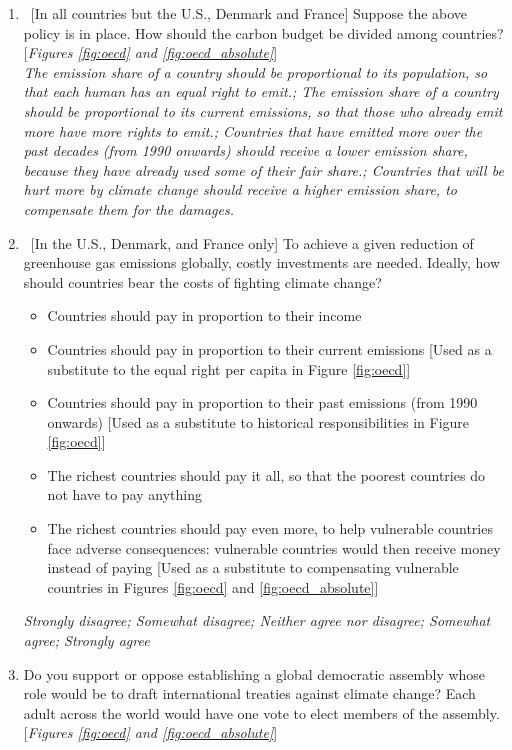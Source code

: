\begin{enumerate}
\item ~[In all countries but the U.S., Denmark and France] Suppose the above policy is in place. How should the carbon budget be divided among countries? [\textit{Figures \ref{fig:oecd} and \ref{fig:oecd_absolute}}]
\\ \textit{The emission share of a country should be proportional to its population, so that each human has an equal right to emit.; The emission share of a country should be proportional to its current emissions, so that those who already emit more have more rights to emit.; Countries that have emitted more over the past decades (from 1990 onwards) should receive a lower emission share, because they have already used some of their fair share.; Countries that will be hurt more by climate change should receive a higher emission share, to compensate them for the damages.}
\item \label{q:burden_sharing_asterisk} ~[In the U.S., Denmark, and France only] To achieve a given reduction of greenhouse gas emissions globally, costly investments are needed. %
Ideally, how should countries bear the costs of fighting climate change?
 \begin{itemize}
\item Countries should pay in proportion to their income
\item Countries should pay in proportion to their current emissions [Used as a substitute to the equal right per capita in Figure \ref{fig:oecd}]
\item Countries should pay in proportion to their past emissions (from 1990 onwards) [Used as a substitute to historical responsibilities in Figure \ref{fig:oecd}]
\item The richest countries should pay it all, so that the poorest countries do not have to pay anything
\item The richest countries should pay even more, to help vulnerable countries face adverse consequences: vulnerable countries would then receive money instead of paying [Used as a substitute to compensating vulnerable countries in Figures \ref{fig:oecd} and \ref{fig:oecd_absolute}]
\end{itemize} 
\textit{Strongly disagree; Somewhat disagree; Neither agree nor disagree; Somewhat agree; Strongly agree}
\item Do you support or oppose establishing a global democratic assembly whose role would be to draft international treaties against climate change? Each adult across the world would have one vote to elect members of the assembly. [\textit{Figures \ref{fig:oecd} and \ref{fig:oecd_absolute}}]

\end{enumerate}
